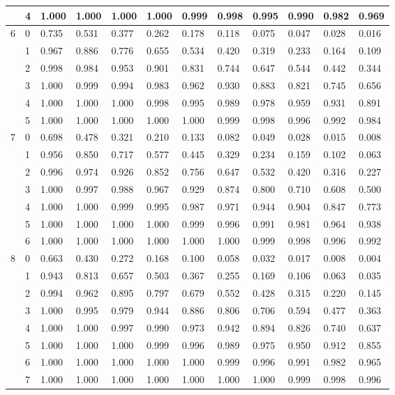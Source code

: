 \documentclass[1pt]{report}
\newcommand{\<}{\langle}
\renewcommand{\>}{\rangle}
\begin{document}
\begin{table}[H]
{{{\begin{tabular}{|l l | l l l l l l l l l l|}
   & 4 & 1.000 & 1.000 & 1.000 & 1.000 & 0.999 & 0.998 & 0.995 & 0.990 & 0.982 & 0.969 \\ \hline\hline
  6 & 0 & 0.735 & 0.531 & 0.377 & 0.262 & 0.178 & 0.118 & 0.075 & 0.047 & 0.028 & 0.016 \\ 
  & 1 & 0.967 & 0.886 & 0.776 & 0.655 & 0.534 & 0.420 & 0.319 & 0.233 & 0.164 & 0.109 \\ 
   & 2 & 0.998 & 0.984 & 0.953 & 0.901 & 0.831 & 0.744 & 0.647 & 0.544 & 0.442 & 0.344 \\ 
   & 3 & 1.000 & 0.999 & 0.994 & 0.983 & 0.962 & 0.930 & 0.883 & 0.821 & 0.745 & 0.656 \\ 
  & 4 & 1.000 & 1.000 & 1.000 & 0.998 & 0.995 & 0.989 & 0.978 & 0.959 & 0.931 & 0.891 \\ 
   & 5 & 1.000 & 1.000 & 1.000 & 1.000 & 1.000 & 0.999 & 0.998 & 0.996 & 0.992 & 0.984 \\ \hline\hline
  7 & 0 & 0.698 & 0.478 & 0.321 & 0.210 & 0.133 & 0.082 & 0.049 & 0.028 & 0.015 & 0.008 \\ 
   & 1 & 0.956 & 0.850 & 0.717 & 0.577 & 0.445 & 0.329 & 0.234 & 0.159 & 0.102 & 0.063 \\ 
   & 2 & 0.996 & 0.974 & 0.926 & 0.852 & 0.756 & 0.647 & 0.532 & 0.420 & 0.316 & 0.227 \\ 
  & 3 & 1.000 & 0.997 & 0.988 & 0.967 & 0.929 & 0.874 & 0.800 & 0.710 & 0.608 & 0.500 \\ 
 & 4 & 1.000 & 1.000 & 0.999 & 0.995 & 0.987 & 0.971 & 0.944 & 0.904 & 0.847 & 0.773 \\ 
   & 5 & 1.000 & 1.000 & 1.000 & 1.000 & 0.999 & 0.996 & 0.991 & 0.981 & 0.964 & 0.938 \\ 
   & 6 & 1.000 & 1.000 & 1.000 & 1.000 & 1.000 & 1.000 & 0.999 & 0.998 & 0.996 & 0.992 \\ 
 \hline \hline
   8 & 0 & 0.663 & 0.430 & 0.272 & 0.168 & 0.100 & 0.058 & 0.032 & 0.017 & 0.008 & 0.004 \\ 
 & 1 & 0.943 & 0.813 & 0.657 & 0.503 & 0.367 & 0.255 & 0.169 & 0.106 & 0.063 & 0.035 \\ 
 & 2 & 0.994 & 0.962 & 0.895 & 0.797 & 0.679 & 0.552 & 0.428 & 0.315 & 0.220 & 0.145 \\ 
 & 3 & 1.000 & 0.995 & 0.979 & 0.944 & 0.886 & 0.806 & 0.706 & 0.594 & 0.477 & 0.363 \\ 
 & 4 & 1.000 & 1.000 & 0.997 & 0.990 & 0.973 & 0.942 & 0.894 & 0.826 & 0.740 & 0.637 \\ 
 & 5 & 1.000 & 1.000 & 1.000 & 0.999 & 0.996 & 0.989 & 0.975 & 0.950 & 0.912 & 0.855 \\ 
 & 6 & 1.000 & 1.000 & 1.000 & 1.000 & 1.000 & 0.999 & 0.996 & 0.991 & 0.982 & 0.965 \\ 
 & 7 & 1.000 & 1.000 & 1.000 & 1.000 & 1.000 & 1.000 & 1.000 & 0.999 & 0.998 & 0.996 \\ \hline
\end{tabular}}
}}
\end{table}
\end{document}
